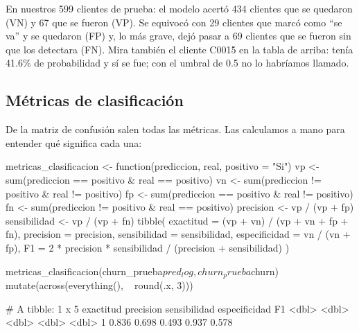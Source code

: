 En nuestros 599 clientes de prueba: el modelo acertó 434 clientes que se
quedaron (VN) y 67 que se fueron (VP). Se equivocó con 29 clientes que marcó
como ``se va'' y se quedaron (FP) y, lo más grave, dejó pasar a 69 clientes que
se fueron sin que los detectara (FN). Mira también el cliente C0015 en la
tabla de arriba: tenía 41.6\% de probabilidad y sí se fue; con el umbral de 0.5
no lo habríamos llamado.

\subsection{Métricas de clasificación}
\label{sec:m7-metricas-clas}

De la matriz de confusión salen todas las métricas. Las calculamos a mano para
entender qué significa cada una:

\begin{rcode}
metricas_clasificacion <- function(prediccion, real, positivo = "Si") {
  vp <- sum(prediccion == positivo & real == positivo)
  vn <- sum(prediccion != positivo & real != positivo)
  fp <- sum(prediccion == positivo & real != positivo)
  fn <- sum(prediccion != positivo & real == positivo)
  precision    <- vp / (vp + fp)
  sensibilidad <- vp / (vp + fn)
  tibble(
    exactitud    = (vp + vn) / (vp + vn + fp + fn),
    precision    = precision,
    sensibilidad = sensibilidad,
    especificidad = vn / (vn + fp),
    F1           = 2 * precision * sensibilidad /
                   (precision + sensibilidad)
  )
}

metricas_clasificacion(churn_prueba$pred_log, churn_prueba$churn) %
  mutate(across(everything(), ~ round(.x, 3)))
\end{rcode}

\begin{rsalida}
# A tibble: 1 x 5
  exactitud precision sensibilidad especificidad    F1
      <dbl>     <dbl>        <dbl>         <dbl> <dbl>
1     0.836     0.698        0.493         0.937 0.578
\end{rsalida}

